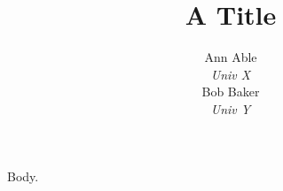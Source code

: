 \documentclass{article}
\begin{document}
\title{A Title}
\author{\begin{tabular}{c}Ann Able\\ {\it Univ X}\\ Bob Baker\\ {\it Univ Y}\end{tabular}}
\maketitle
Body.
\end{document}
